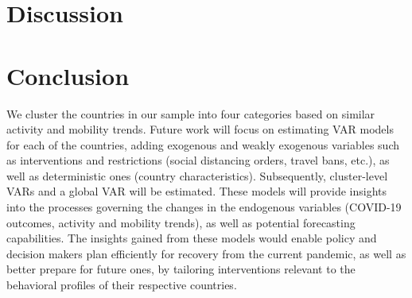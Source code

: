 \documentclass[preprint, 11pt]{elsarticle}
\newcommand{\?}{\stackrel{?}{=}}
\begin{document}
\section{Discussion}

\section{Conclusion }
We cluster the countries in our sample into four categories based on similar activity and mobility trends.
Future work will focus on estimating VAR models for each of the countries, adding exogenous and weakly exogenous variables such as interventions and restrictions (social distancing orders, travel bans, etc.), as well as deterministic ones (country characteristics).
Subsequently, cluster-level VARs and a global VAR will be estimated.
These models will provide insights into the processes governing the changes in the endogenous variables (COVID-19 outcomes, activity and mobility trends), as well as potential forecasting capabilities.
The insights gained from these models would enable policy and decision makers plan efficiently for recovery from the current pandemic, as well as better prepare for future ones, by tailoring interventions relevant to the behavioral profiles of their respective countries.
 




\end{document}
